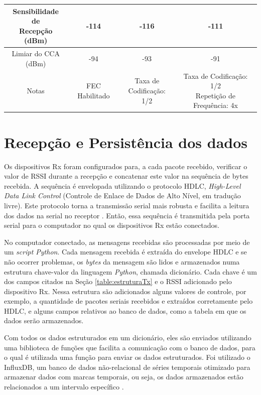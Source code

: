\begin{table}[H]
\begin{tabular}{|c c c c|}
    \makecell{Sensibilidade de                                \\Recepção (dBm)       } & -114    & -116                     & -111     \\\hline
    \makecell{Limiar do CCA                                   \\(dBm)                   } & -94     & -93                      & -91      \\ \hline
    Notas     & FEC Habilitado & \makecell{Taxa de            \\Codificação: 1/2} & \makecell{Taxa de Codificação: 1/2\\Repetição de Frequência: 4x} \\ \hline
    \hline
  \end{tabular}
  \label{table:config}
\end{table}

\section{Recepção e Persistência dos dados}
Os dispositivos Rx foram configurados para, a cada pacote recebido, verificar o valor de RSSI durante a recepção e concatenar este valor na sequência de bytes recebida. A sequência é envelopada utilizando o protocolo HDLC, \emph{High-Level Data Link Control} (Controle de Enlace de Dados de Alto Nível, em tradução livre). Este protocolo torna a transmissão serial mais robusta e facilita a leitura dos dados na serial no receptor \cite{tanembaum2011}. Então, essa sequência é transmitida pela porta serial para o computador no qual os dispositivos Rx estão conectados.

No computador conectado, as mensagens recebidas são processadas por  meio de um \emph{script Python}. Cada mensagem recebida é extraída do envelope HDLC e se não ocorrer problemas, os \emph{bytes} da mensagem são lidos e armazenados numa estrutura chave-valor da linguagem \emph{Python}, chamada dicionário. Cada chave é um dos campos citados na Seção \ref{table:estruturaTx} e o RSSI adicionado pelo dispositivo Rx. Nessa estrutura são adicionados alguns valores de controle, por exemplo, a quantidade de pacotes seriais recebidos e extraídos corretamente pelo HDLC, e alguns campos relativos ao banco de dados, como a tabela em que os dados serão armazenados.

Com todos os dados estruturados em um dicionário, eles são enviados utilizando uma biblioteca de funções que facilita a comunicação com o banco de dados, para o qual é utilizada uma função para enviar os dados estruturados. Foi utilizado o InfluxDB, um banco de dados não-relacional de séries temporais otimizado para armazenar dados com marcas temporais, ou seja, os dados armazenados estão relacionados a um intervalo específico \cite{influxData}.

